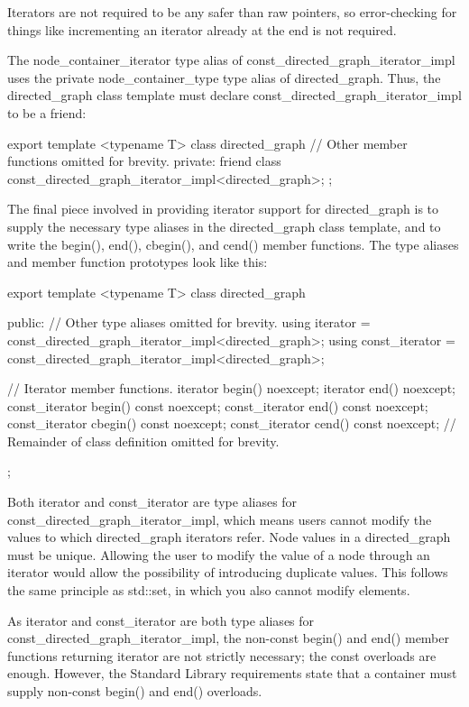 Iterators are not required to be any safer than raw pointers, so error-checking for things like incrementing an iterator already at the end is not required.

The node\_container\_iterator type alias of const\_directed\_graph\_iterator\_impl uses the private node\_container\_type type alias of directed\_graph. Thus, the directed\_graph class template must declare const\_directed\_graph\_iterator\_impl to be a friend:

\begin{cpp}
export template <typename T>
class directed_graph
{
    // Other member functions omitted for brevity.
    private:
        friend class const_directed_graph_iterator_impl<directed_graph>;
};
\end{cpp}


The final piece involved in providing iterator support for directed\_graph is to supply the necessary type aliases in the directed\_graph class template, and to write the begin(), end(), cbegin(), and cend() member functions. The type aliases and member function prototypes look like this:

\begin{cpp}
export template <typename T>
class directed_graph
{
    public:
        // Other type aliases omitted for brevity.
        using iterator = const_directed_graph_iterator_impl<directed_graph>;
        using const_iterator = const_directed_graph_iterator_impl<directed_graph>;

        // Iterator member functions.
        iterator begin() noexcept;
        iterator end() noexcept;
        const_iterator begin() const noexcept;
        const_iterator end() const noexcept;
        const_iterator cbegin() const noexcept;
        const_iterator cend() const noexcept;
        // Remainder of class definition omitted for brevity.
};
\end{cpp}

Both iterator and const\_iterator are type aliases for const\_directed\_graph\_iterator\_impl, which means users cannot modify the values to which directed\_graph iterators refer. Node values in a directed\_graph must be unique. Allowing the user to modify the value of a node through an iterator would allow the possibility of introducing duplicate values. This follows the same principle as std::set, in which you also cannot modify elements.

As iterator and const\_iterator are both type aliases for const\_directed\_graph\_iterator\_impl, the non-const begin() and end() member functions returning iterator are not strictly necessary; the const overloads are enough. However, the Standard Library requirements state that a container must supply non-const begin() and end() overloads.

